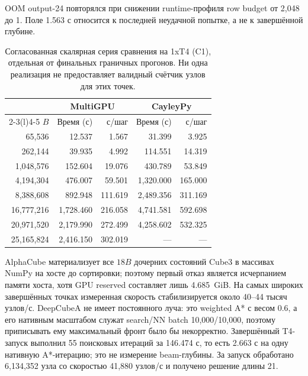 \documentclass[10pt,twocolumn]{article}
\begin{document}
OOM output-24 повторялся при снижении runtime-профиля row budget от 2,048 до
1. Поле 1.563 с относится к последней неудачной попытке, а не к завершённой
глубине.

\begin{table}[t]
\centering
\small
\setlength{\tabcolsep}{2pt}
\caption{Согласованная скалярная серия сравнения на 1xT4 (C1), отдельная от
финальных граничных прогонов. Ни одна реализация не предоставляет валидный
счётчик узлов для этих точек.}
\label{tab:megaminx_curve}
\begin{tabular}{@{}rrrrr@{}}
\toprule
& \multicolumn{2}{c}{MultiGPU} & \multicolumn{2}{c}{CayleyPy} \\
\cmidrule(lr){2-3}\cmidrule(l){4-5}
$B$ & Время (с) & с/шаг & Время (с) & с/шаг \\
\midrule
65,536     & 12.537    & 1.567   & 31.399    & 3.925 \\
262,144    & 39.935    & 4.992   & 114.551   & 14.319 \\
1,048,576  & 152.604   & 19.076  & 430.789   & 53.849 \\
4,194,304  & 476.007   & 59.501  & 1,320.000 & 165.000 \\
8,388,608  & 892.948   & 111.619 & 2,489.356 & 311.169 \\
16,777,216 & 1,728.460 & 216.058 & 4,741.581 & 592.698 \\
20,971,520 & 2,179.990 & 272.499 & 4,258.602 & 532.325 \\
25,165,824 & 2,416.150 & 302.019 & ---       & --- \\
\bottomrule
\end{tabular}
\end{table}

AlphaCube материализует все $18B$ дочерних состояний Cube3 в массивах NumPy
на хосте до сортировки; поэтому первый отказ является исчерпанием памяти хоста,
хотя GPU reserved составляет лишь 4.685~GiB. На самых широких завершённых
точках измеренная скорость стабилизируется около 40--44 тысяч узлов/с.
DeepCubeA не имеет постоянного луча: это weighted A* с весом $0.6$, а его
нативным масштабом служат search/NN batch 10,000/10,000, поэтому приписывать ему максимальный
фронт было бы некорректно. Завершённый T4-запуск выполнил 55 поисковых
итераций за 146.474 с, то есть 2.663 с на одну нативную A*-итерацию; это не
измерение beam-глубины. За запуск обработано 6,134,352 узла со скоростью
41,880 узлов/с и получено решение длины 21.
\end{document}
